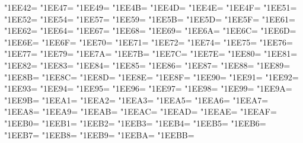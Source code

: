 \XeTeXcharclass"1EE42=\KclassArabU
\XeTeXcharclass"1EE47=\KclassArabU
\XeTeXcharclass"1EE49=\KclassArabU
\XeTeXcharclass"1EE4B=\KclassArabU
\XeTeXcharclass"1EE4D=\KclassArabU
\XeTeXcharclass"1EE4E=\KclassArabU
\XeTeXcharclass"1EE4F=\KclassArabU
\XeTeXcharclass"1EE51=\KclassArabU
\XeTeXcharclass"1EE52=\KclassArabU
\XeTeXcharclass"1EE54=\KclassArabU
\XeTeXcharclass"1EE57=\KclassArabU
\XeTeXcharclass"1EE59=\KclassArabU
\XeTeXcharclass"1EE5B=\KclassArabU
\XeTeXcharclass"1EE5D=\KclassArabU
\XeTeXcharclass"1EE5F=\KclassArabU
\XeTeXcharclass"1EE61=\KclassArabU
\XeTeXcharclass"1EE62=\KclassArabU
\XeTeXcharclass"1EE64=\KclassArabU
\XeTeXcharclass"1EE67=\KclassArabU
\XeTeXcharclass"1EE68=\KclassArabU
\XeTeXcharclass"1EE69=\KclassArabU
\XeTeXcharclass"1EE6A=\KclassArabU
\XeTeXcharclass"1EE6C=\KclassArabU
\XeTeXcharclass"1EE6D=\KclassArabU
\XeTeXcharclass"1EE6E=\KclassArabU
\XeTeXcharclass"1EE6F=\KclassArabU
\XeTeXcharclass"1EE70=\KclassArabU
\XeTeXcharclass"1EE71=\KclassArabU
\XeTeXcharclass"1EE72=\KclassArabU
\XeTeXcharclass"1EE74=\KclassArabU
\XeTeXcharclass"1EE75=\KclassArabU
\XeTeXcharclass"1EE76=\KclassArabU
\XeTeXcharclass"1EE77=\KclassArabU
\XeTeXcharclass"1EE79=\KclassArabU
\XeTeXcharclass"1EE7A=\KclassArabU
\XeTeXcharclass"1EE7B=\KclassArabU
\XeTeXcharclass"1EE7C=\KclassArabU
\XeTeXcharclass"1EE7E=\KclassArabU
\XeTeXcharclass"1EE80=\KclassArabU
\XeTeXcharclass"1EE81=\KclassArabU
\XeTeXcharclass"1EE82=\KclassArabU
\XeTeXcharclass"1EE83=\KclassArabU
\XeTeXcharclass"1EE84=\KclassArabU
\XeTeXcharclass"1EE85=\KclassArabU
\XeTeXcharclass"1EE86=\KclassArabU
\XeTeXcharclass"1EE87=\KclassArabU
\XeTeXcharclass"1EE88=\KclassArabU
\XeTeXcharclass"1EE89=\KclassArabU
\XeTeXcharclass"1EE8B=\KclassArabU
\XeTeXcharclass"1EE8C=\KclassArabU
\XeTeXcharclass"1EE8D=\KclassArabU
\XeTeXcharclass"1EE8E=\KclassArabU
\XeTeXcharclass"1EE8F=\KclassArabU
\XeTeXcharclass"1EE90=\KclassArabU
\XeTeXcharclass"1EE91=\KclassArabU
\XeTeXcharclass"1EE92=\KclassArabU
\XeTeXcharclass"1EE93=\KclassArabU
\XeTeXcharclass"1EE94=\KclassArabU
\XeTeXcharclass"1EE95=\KclassArabU
\XeTeXcharclass"1EE96=\KclassArabU
\XeTeXcharclass"1EE97=\KclassArabU
\XeTeXcharclass"1EE98=\KclassArabU
\XeTeXcharclass"1EE99=\KclassArabU
\XeTeXcharclass"1EE9A=\KclassArabU
\XeTeXcharclass"1EE9B=\KclassArabU
\XeTeXcharclass"1EEA1=\KclassArabU
\XeTeXcharclass"1EEA2=\KclassArabU
\XeTeXcharclass"1EEA3=\KclassArabU
\XeTeXcharclass"1EEA5=\KclassArabU
\XeTeXcharclass"1EEA6=\KclassArabU
\XeTeXcharclass"1EEA7=\KclassArabU
\XeTeXcharclass"1EEA8=\KclassArabU
\XeTeXcharclass"1EEA9=\KclassArabU
\XeTeXcharclass"1EEAB=\KclassArabU
\XeTeXcharclass"1EEAC=\KclassArabU
\XeTeXcharclass"1EEAD=\KclassArabU
\XeTeXcharclass"1EEAE=\KclassArabU
\XeTeXcharclass"1EEAF=\KclassArabU
\XeTeXcharclass"1EEB0=\KclassArabU
\XeTeXcharclass"1EEB1=\KclassArabU
\XeTeXcharclass"1EEB2=\KclassArabU
\XeTeXcharclass"1EEB3=\KclassArabU
\XeTeXcharclass"1EEB4=\KclassArabU
\XeTeXcharclass"1EEB5=\KclassArabU
\XeTeXcharclass"1EEB6=\KclassArabU
\XeTeXcharclass"1EEB7=\KclassArabU
\XeTeXcharclass"1EEB8=\KclassArabU
\XeTeXcharclass"1EEB9=\KclassArabU
\XeTeXcharclass"1EEBA=\KclassArabU
\XeTeXcharclass"1EEBB=\KclassArabU

